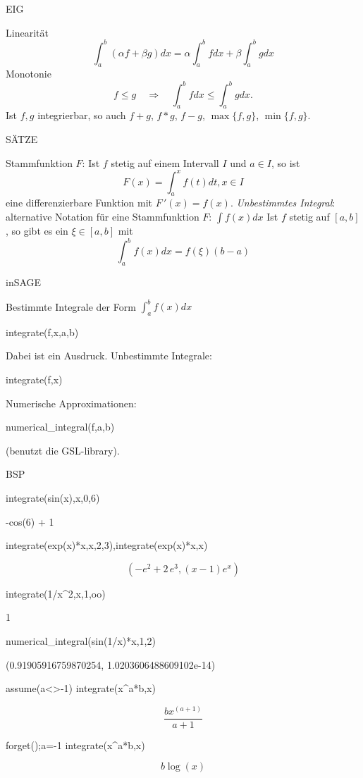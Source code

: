 \documentclass[fontsize=12pt,paper=a4,twoside,bibtotoc,idxtotoc,
liststotoc,pagesize,BCOR1.2cm,DIV15,chapterprefix,pagesize=pdftex]{scrbook}
\theoremstyle{plain}
\theoremstyle{definition}
\theoremstyle{remark}
\begin{document}
EIG


 Linearität
\[ \int_a^b (\alpha f + \beta g) dx = \alpha \int_a^b fdx + \beta
\int_a^b g dx \]
 Monotonie
\[  f \leq g \quad \Rightarrow \quad \int_a^b f dx \leq \int_a^b g
dx.\]
 Ist $f,g$ integrierbar, so auch $f+g$, $f*g$, $f-g$,
$\max\{f,g\}$, $\min \{f,g \}$. 


SÄTZE


 {\color{red} Stammfunktion} $F$: Ist $f$ stetig auf einem Intervall $I$ und $a \in I$, so ist 
\[F(x)= \int_a^x f(t) dt, x \in I \] eine differenzierbare Funktion mit
$F\,'(x)=f(x)$. 
 \emph{Unbestimmtes Integral}: alternative Notation für eine Stammfunktion $F$:  $\int f(x) dx$ 
 Ist $f$ stetig auf $[a,b]$, so gibt es ein $\xi \in [a,b]$ mit
\[\int_a^b f(x)dx = f(\xi) (b-a)\]


inSAGE


  Bestimmte Integrale der Form $\int_a^b f(x) dx$
\begin{sagein}
integrate(f,x,a,b) 
\end{sagein}
Dabei ist  ein Ausdruck.
 Unbestimmte Integrale:
\begin{sagein}
integrate(f,x)
\end{sagein}
 Numerische Approximationen:
\begin{sagein}
numerical_integral(f,a,b) 
\end{sagein}
(benutzt die GSL-library).


BSP

\begin{sagein}
 integrate(sin(x),x,0,6)
\end{sagein}
\begin{sage}
-cos(6) + 1
\end{sage}
\begin{sagein}
integrate(exp(x)*x,x,2,3),integrate(exp(x)*x,x)
\end{sagein}
{\color{blue}\[\left(-e^{2} + 2 \, e^{3}, {\left(x - 1\right)} e^{x}\right)\]}
\begin{sagein}
integrate(1/x^2,x,1,oo)
\end{sagein}
\begin{sage}
  1
\end{sage}
\begin{sagein}
numerical_integral(sin(1/x)*x,1,2)
\end{sagein}
\begin{sage}
  (0.91905916759870254, 1.0203606488609102e-14)
\end{sage}
\begin{sagein}
assume(a<>-1)
integrate(x^a*b,x)
\end{sagein}
{\color{blue} \[ \frac{b x^{{\left(a + 1\right)}}}{a + 1}\]}
\begin{sagein}
forget();a=-1
integrate(x^a*b,x)
\end{sagein}
{\color{blue} \[ b \log\left(x\right)\]}
\end{document}

